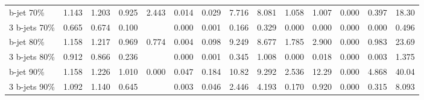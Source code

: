 \begin{table}
\begin{center}
{\begin{tabular}{l||cccc||cc|ccc|ccc||c }
            b-jet  70\%   &        1.143 &        1.203 &        0.925 &      2.443 &        0.014 &        0.029 &        7.716 &        8.081 &        1.058 &        1.007 &        0.000 &        0.397 &       18.30     \\        
            3 b-jets 70\% &        0.665 &        0.674 &        0.100 &            &        0.000 &        0.001 &        0.166 &        0.329 &        0.000 &        0.000 &        0.000 &        0.000 &        0.496    \\\hline  
                                                                                                                                                                                                                                     
            b-jet 80\%    &        1.158 &        1.217 &        0.969 &      0.774 &        0.004 &        0.098 &        9.249 &        8.677 &        1.785 &        2.900 &        0.000 &        0.983 &       23.69     \\        
            3 b-jets 80\% &        0.912 &        0.866 &        0.236 &            &        0.000 &        0.001 &        0.345 &        1.008 &        0.000 &        0.018 &        0.000 &        0.003 &        1.375    \\\hline  
                                                                                                                                                                                                                                     
            b-jet 90\%    &        1.158 &        1.226 &        1.010 &      0.000 &        0.047 &        0.184 &       10.82  &        9.292 &        2.536 &       12.29  &        0.000 &        4.868 &       40.04     \\        
            3 b-jets 90\% &        1.092 &        1.140 &        0.645 &            &        0.003 &        0.046 &        2.446 &        4.193 &        0.170 &        0.920 &        0.000 &        0.315 &        8.093    \\\hline             
        \end{tabular}
}
\end{center}
\end{table}

